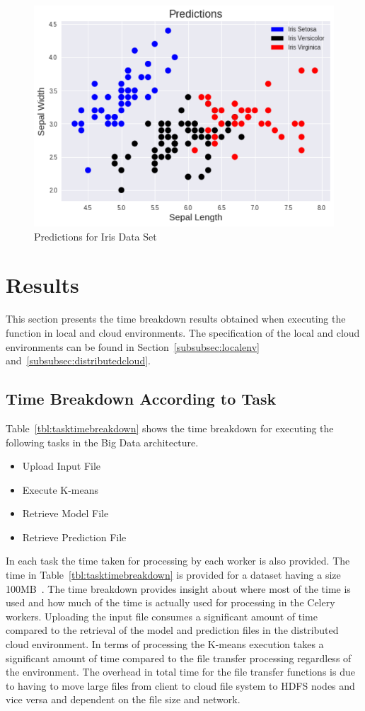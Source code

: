 \begin{figure}[htbp] 
	\centering
	\includegraphics[width=0.8\columnwidth]{images/irispredictions.pdf}
	\caption{Predictions for Iris Data Set}
\label{fig:irispredictions} 
\end{figure}

\section{Results}

This section presents the time breakdown results obtained when executing the 
function in local and cloud environments. The specification of the local and 
cloud environments can be found in Section~\ref{subsubsec:localenv} 
and~\ref{subsubsec:distributedcloud}.

\subsection{Time Breakdown According to Task}

Table~\ref{tbl:tasktimebreakdown} shows the time breakdown for executing the 
following tasks in the Big Data architecture.

\begin{itemize}
	\item Upload Input File 
	\item Execute K-means
	\item Retrieve Model File
	\item Retrieve Prediction File
\end{itemize}

In each task the time taken for processing by each worker is also provided. 
The time in Table~\ref{tbl:tasktimebreakdown} is provided for a dataset having 
a size 100MB~\cite{hid-sp18-416-www-iot-dataset}. The time breakdown provides 
insight about where most of the time is used and how much of the time is 
actually used for processing in the Celery workers. Uploading the input file 
consumes a significant amount of time compared to the retrieval of the model 
and prediction files in the distributed cloud environment. In terms of 
processing the K-means execution takes a significant amount of time compared 
to the file transfer processing regardless of the environment. The overhead in 
total time for the file transfer functions is due to having to move large 
files from client to cloud file system to HDFS nodes and vice versa and 
dependent on the file size and network.

